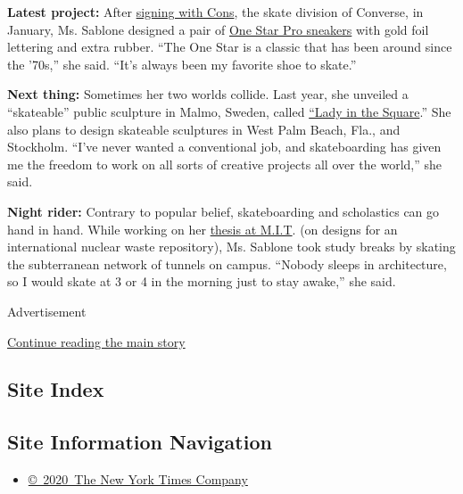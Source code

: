 \textbf{Latest project:} After
\href{https://www.youtube.com/watch?v=Gx6zy149U5g}{signing with Cons},
the skate division of Converse, in January, Ms. Sablone designed a pair
of \href{https://news.nike.com/news/alexis-sablone-one-star-pro}{One
Star Pro sneakers} with gold foil lettering and extra rubber. ``The One
Star is a classic that has been around since the '70s,'' she said.
``It's always been my favorite shoe to skate.''

\textbf{Next thing:} Sometimes her two worlds collide. Last year, she
unveiled a ``skateable'' public sculpture in Malmo, Sweden, called
\href{http://mediumskatemag.com/inthesquare/}{``Lady in the Square}.''
She also plans to design skateable sculptures in West Palm Beach, Fla.,
and Stockholm. ``I've never wanted a conventional job, and skateboarding
has given me the freedom to work on all sorts of creative projects all
over the world,'' she said.

\textbf{Night rider:} Contrary to popular belief, skateboarding and
scholastics can go hand in hand. While working on her
\href{http://news.mit.edu/2013/student-profile-alexis-sablone-0712}{thesis
at M.I.T}. (on designs for an international nuclear waste repository),
Ms. Sablone took study breaks by skating the subterranean network of
tunnels on campus. ``Nobody sleeps in architecture, so I would skate at
3 or 4 in the morning just to stay awake,'' she said.

Advertisement

\protect\hyperlink{after-bottom}{Continue reading the main story}

\hypertarget{site-index}{%
\subsection{Site Index}\label{site-index}}

\hypertarget{site-information-navigation}{%
\subsection{Site Information
Navigation}\label{site-information-navigation}}

\begin{itemize}
\tightlist
\item
  \href{https://help.nytimes.com/hc/en-us/articles/115014792127-Copyright-notice}{©~2020~The
  New York Times Company}
\end{itemize}

